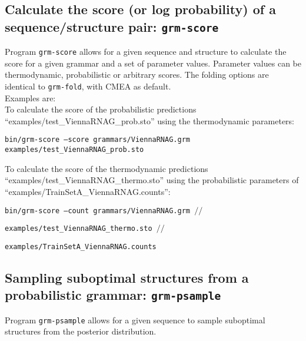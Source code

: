 \subsection{Calculate the score (or log probability) of a sequence/structure pair: \texttt{grm-score}}

Program \texttt{grm-score} allows for a given sequence and structure
to calculate the score for a given grammar and a set of parameter
values.  Parameter values can be thermodynamic, probabilistic or
arbitrary scores. The folding options are identical to
\texttt{grm-fold}, with CMEA as default.\\

\noindent
Examples are:\\

\noindent
To calculate the score of the probabilistic predictions ``examples/test\_ViennaRNAG\_prob.sto'' using
the thermodynamic parameters:\\

\begin{footnotesize}
\texttt{bin/grm-score --score grammars/ViennaRNAG.grm examples/test\_ViennaRNAG\_prob.sto}\\
\end{footnotesize}

\noindent
To calculate the score of the thermodynamic predictions ``examples/test\_ViennaRNAG\_thermo.sto'' using
the probabilistic parameters of ``examples/TrainSetA\_ViennaRNAG.counts'':\\

\begin{footnotesize}
  \texttt{bin/grm-score --count grammars/ViennaRNAG.grm $//$}
  
  \hspace{15mm}\texttt{examples/test\_ViennaRNAG\_thermo.sto $//$}

  \hspace{15mm}\texttt{examples/TrainSetA\_ViennaRNAG.counts}\\
\end{footnotesize}


\subsection{Sampling suboptimal structures from a probabilistic grammar: \texttt{grm-psample}}
Program \texttt{grm-psample} allows for a given sequence to sample
suboptimal structures from the posterior distribution.\\

